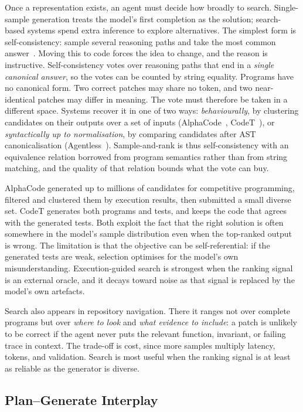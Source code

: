 \documentclass[
  english,        %
  font=times,     %
  twocolumn,      %
]{tumarticle}
\begin{document}
Once a representation exists, an agent must decide how broadly to search.
Single-sample generation treats the model's first completion as the solution;
search-based systems spend extra inference to explore alternatives. The simplest
form is self-consistency: sample several reasoning paths and take the most common
answer~\cite{wang2023selfconsistency}. Moving this to code forces the idea to
change, and the reason is instructive. Self-consistency votes over reasoning paths
that end in a \emph{single canonical answer}, so the votes can be counted by
string equality. Programs have no canonical form. Two correct patches may share no
token, and two near-identical patches may differ in meaning. The vote must
therefore be taken in a different space. Systems recover it in one of two ways:
\emph{behaviourally}, by clustering candidates on their outputs over a set of
inputs (AlphaCode~\cite{li2022alphacode}, CodeT~\cite{chen2022codet}), or
\emph{syntactically up to normalisation}, by comparing candidates after AST
canonicalisation (Agentless~\cite{xia2024agentless}). Sample-and-rank is thus
self-consistency with an equivalence relation borrowed from program semantics
rather than from string matching, and the quality of that relation bounds what the
vote can buy.

AlphaCode generated up to millions of candidates for competitive programming,
filtered and clustered them by execution results, then submitted a small diverse
set. CodeT generates both programs and tests, and keeps the code that agrees with
the generated tests. Both exploit the fact that the right solution is often
somewhere in the model's sample distribution even when the top-ranked output is
wrong. The
limitation is that the objective can be self-referential: if the generated tests
are weak, selection optimises for the model's own misunderstanding.
Execution-guided search is strongest when the ranking signal is an external
oracle, and it decays toward noise as that signal is replaced by the model's own
artefacts.

Search also appears in repository navigation. There it ranges not over complete
programs but over \emph{where to look} and \emph{what evidence to include}: a
patch is unlikely to be correct if the agent never puts the relevant function,
invariant, or failing trace in context. The trade-off is cost, since more samples
multiply latency, tokens, and validation. Search is most useful when the ranking
signal is at least as reliable as the generator is diverse.

\subsection{Plan--Generate Interplay}
\end{document}

